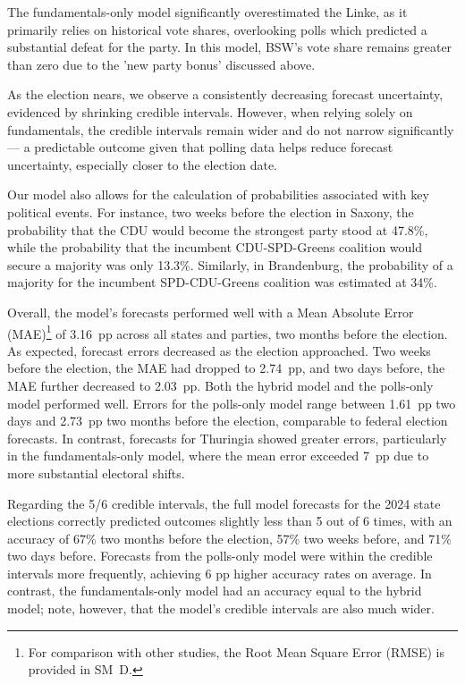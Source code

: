 \documentclass[doublespaced,12pt]{article}
\begin{document}
\begin{doublespacing}
The fundamentals-only model significantly overestimated the Linke, as it primarily relies on historical vote shares, overlooking polls which predicted a substantial defeat for the party. In this model, BSW's vote share remains greater than zero due to the 'new party bonus' discussed above.

As the election nears, we observe a consistently decreasing forecast uncertainty, evidenced by shrinking credible intervals. However, when relying solely on fundamentals, the credible intervals remain wider and do not narrow significantly — a predictable outcome given that polling data helps reduce forecast uncertainty, especially closer to the election date.

Our model also allows for the calculation of probabilities associated with key political events. For instance, two weeks before the election in Saxony, the probability that the CDU would become the strongest party stood at 47.8\%, while the probability that the incumbent CDU-SPD-Greens coalition would secure a majority was only 13.3\%. Similarly, in Brandenburg, the probability of a majority for the incumbent SPD-CDU-Greens coalition was estimated at 34\%.

Overall, the model's forecasts performed well with a Mean Absolute Error (MAE)\footnote{For comparison with other studies, the Root Mean Square Error (RMSE) is provided in SM~D.} of 3.16~pp across all states and parties, two months before the election. As expected, forecast errors decreased as the election approached. Two weeks before the election, the MAE had dropped to 2.74~pp, and two days before, the MAE further decreased to 2.03~pp. Both the hybrid model and the polls-only model performed well. Errors for the polls-only model range between 1.61~pp two days and 2.73~pp two months before the election, comparable to federal election forecasts. In contrast, forecasts for Thuringia showed greater errors, particularly in the fundamentals-only model, where the mean error exceeded 7~pp due to more substantial electoral shifts.

Regarding the 5/6 credible intervals, the full model forecasts for the 2024 state elections correctly predicted outcomes slightly less than 5 out of 6 times, with an accuracy of 67\% two months before the election, 57\% two weeks before, and 71\% two days before. Forecasts from the polls-only model were within the credible intervals more frequently, achieving 6 pp higher accuracy rates on average. In contrast, the fundamentals-only model had an accuracy equal to the hybrid model; note, however, that the model's credible intervals are also much wider.



\end{doublespacing}
\end{document}

